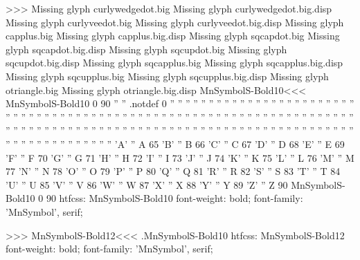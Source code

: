 >>>
Missing glyph	curlywedgedot.big
Missing glyph	curlywedgedot.big.disp
Missing glyph	curlyveedot.big
Missing glyph	curlyveedot.big.disp
Missing glyph	capplus.big
Missing glyph	capplus.big.disp
Missing glyph	sqcapdot.big
Missing glyph	sqcapdot.big.disp
Missing glyph	sqcupdot.big
Missing glyph	sqcupdot.big.disp
Missing glyph	sqcapplus.big
Missing glyph	sqcapplus.big.disp
Missing glyph	sqcupplus.big
Missing glyph	sqcupplus.big.disp
Missing glyph	otriangle.big
Missing glyph	otriangle.big.disp
\<MnSymbolS-Bold10\><<<
MnSymbolS-Bold10 0 90
'' '' .notdef 0  %
'' ''            %
'' ''            %
'' ''            %
'' ''            %
'' ''            %
'' ''            %
'' ''            %
'' ''            %
'' ''            %
'' ''            %
'' ''            %
'' ''            %
'' ''            %
'' ''            %
'' ''            %
'' ''            %
'' ''            %
'' ''  
'' ''  
'' ''  
'' ''  
'' ''  
'' ''  
'' ''  
'' ''  
'' ''  
'' ''  
'' ''  
'' ''  
'' ''  
'' ''  
'' ''  
'' ''  
'' ''  
'' ''  
'' ''  
'' ''  
'' ''  
'' ''  
'' ''  
'' ''  
'' ''  
'' ''  
'' ''  
'' ''  
'' ''  
'' ''  
'' ''  
'' ''  
'' ''  
'' ''  
'' ''  
'' ''  
'' ''  
'' ''  
'' ''  
'' ''  
'' ''  
'' ''  
'' ''  
'' ''  
'' ''  
'' ''  
'' ''  
'A' '' A 65
'B' '' B 66
'C' '' C 67
'D' '' D 68
'E' '' E 69
'F' '' F 70
'G' '' G 71
'H' '' H 72
'I' '' I 73
'J' '' J 74
'K' '' K 75
'L' '' L 76
'M' '' M 77
'N' '' N 78
'O' '' O 79
'P' '' P 80
'Q' '' Q 81
'R' '' R 82
'S' '' S 83
'T' '' T 84
'U' '' U 85
'V' '' V 86
'W' '' W 87
'X' '' X 88
'Y' '' Y 89
'Z' '' Z 90
MnSymbolS-Bold10 0 90
htfcss:  MnSymbolS-Bold10  font-weight: bold; font-family: 'MnSymbol', serif;

>>>
\<MnSymbolS-Bold12\><<<
.MnSymbolS-Bold10
htfcss:  MnSymbolS-Bold12  font-weight: bold; font-family: 'MnSymbol', serif;

